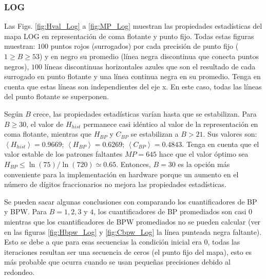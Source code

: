 \subsubsection{LOG} \label{subsubsec:log}

Las Figs. \ref{fig:Hval_Log} a \ref{fig:MP_Log} muestran las propiedades estadísticas del mapa LOG en representación de coma flotante y punto fijo.
Todas estas figuras muestran: $100$ puntos rojos (surrogados) por cada precisión de punto fijo ($1 \geq B \geq 53$) y en negro su promedio (línea negra discontinua que conecta puntos negros), $100$ líneas discontinuas horizontales azules que son el resultado de cada surrogado en punto flotante y una línea continua negra en su promedio.
Tenga en cuenta que estas líneas son independientes del eje x.
En este caso, todas las líneas del punto flotante se superponen.

Según $B$ crece, las propiedades estadísticas varían hasta que se estabilizan.
Para $B \geq 30$, el valor de $H_{hist}$ permanece casi idéntico al valor de la representación en coma flotante, mientras que $H_{BP}$ y $C_{BP}$ se estabilizan a $B > 21$.
Sus valores son: $\left\langle H_{hist}\right\rangle = 0.9669$; $\left\langle H_{BP}\right\rangle = 0.6269$; $\left\langle C_{BP}\right\rangle = 0.4843$.
Tenga en cuenta que el valor estable de los patrones faltantes $MP = 645$ hace que el valor óptimo sea $H_{BP} \leq \ln(75)/\ln(720) \simeq 0.65$.
Entonces, $B = 30$ es la opción más conveniente para la implementación en hardware porque un aumento en el número de dígitos fraccionarios no mejora las propiedades estadísticas.

Se pueden sacar algunas conclusiones con comparando los cuantificadores de BP y BPW.
Para $B = 1, 2, 3$ y $4$, los cuantificadores de BP promediados son casi $0$ mientras que los cuantificadores de BPW promediados no se pueden calcular (ver en las figuras \ref{fig:Hbpw_Log} y \ref{fig:Cbpw_Log} la línea punteada negra faltante).
Esto se debe a que para esas secuencias la condición inicial era $0$, todas las iteraciones resultan ser una secuencia de ceros (el punto fijo del mapa), esto es más probable que ocurra cuando se usan pequeñas precisiones debido al redondeo.

